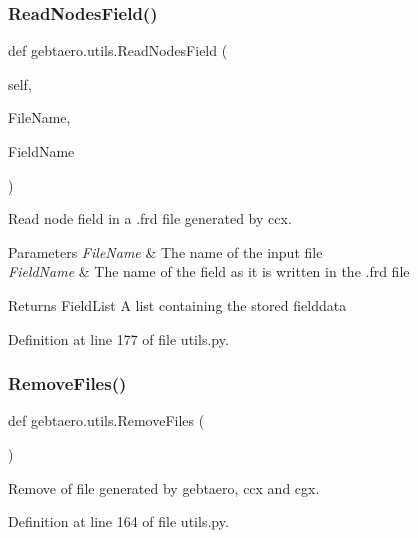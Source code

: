 \subsubsection{\texorpdfstring{Read\+Nodes\+Field()}{ReadNodesField()}}
{\footnotesize\ttfamily def gebtaero.\+utils.\+Read\+Nodes\+Field (\begin{DoxyParamCaption}\item[{}]{self,  }\item[{}]{File\+Name,  }\item[{}]{Field\+Name }\end{DoxyParamCaption})}



Read node field in a .frd file generated by ccx. 


\begin{DoxyParams}{Parameters}
{\em File\+Name} & The name of the input file \\
\hline
{\em Field\+Name} & The name of the field as it is written in the .frd file \\
\hline
\end{DoxyParams}
\begin{DoxyReturn}{Returns}
Field\+List A list containing the stored fielddata 
\end{DoxyReturn}


Definition at line 177 of file utils.\+py.

\mbox{\label{namespacegebtaero_1_1utils_a14f397a623bb26fcf8b4dcd64228aa05}} 
\subsubsection{\texorpdfstring{Remove\+Files()}{RemoveFiles()}}
{\footnotesize\ttfamily def gebtaero.\+utils.\+Remove\+Files (\begin{DoxyParamCaption}{ }\end{DoxyParamCaption})}



Remove of file generated by gebtaero, ccx and cgx. 



Definition at line 164 of file utils.\+py.

